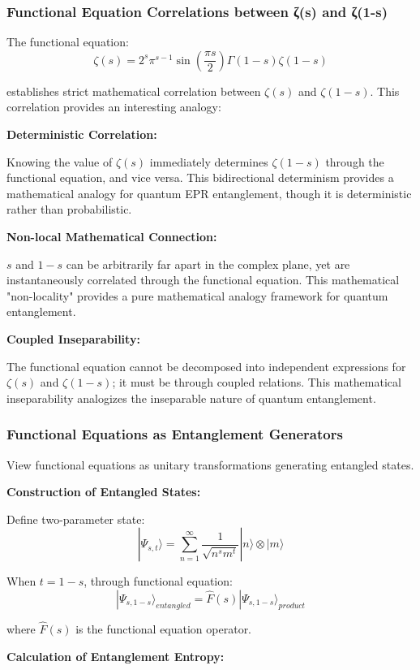 \documentclass[11pt]{article}
\theoremstyle{plain}
\theoremstyle{definition}
\theoremstyle{remark}
\begin{document}
\subsubsection{Functional Equation Correlations between ζ(s) and ζ(1-s)}

The functional equation:
$$\zeta(s) = 2^s \pi^{s-1} \sin(\frac{\pi s}{2}) \Gamma(1-s) \zeta(1-s)$$

establishes strict mathematical correlation between $\zeta(s)$ and $\zeta(1-s)$. This correlation provides an interesting analogy:

\textbf{Deterministic Correlation:}

Knowing the value of $\zeta(s)$ immediately determines $\zeta(1-s)$ through the functional equation, and vice versa. This bidirectional determinism provides a mathematical analogy for quantum EPR entanglement, though it is deterministic rather than probabilistic.

\textbf{Non-local Mathematical Connection:}

$s$ and $1-s$ can be arbitrarily far apart in the complex plane, yet are instantaneously correlated through the functional equation. This mathematical "non-locality" provides a pure mathematical analogy framework for quantum entanglement.

\textbf{Coupled Inseparability:}

The functional equation cannot be decomposed into independent expressions for $\zeta(s)$ and $\zeta(1-s)$; it must be through coupled relations. This mathematical inseparability analogizes the inseparable nature of quantum entanglement.

\subsubsection{Functional Equations as Entanglement Generators}

View functional equations as unitary transformations generating entangled states.

\textbf{Construction of Entangled States:}

Define two-parameter state:
$$|\Psi_{s,t}\rangle = \sum_{n=1}^{\infty} \frac{1}{\sqrt{n^s m^t}} |n\rangle \otimes |m\rangle$$

When $t = 1-s$, through functional equation:
$$|\Psi_{s,1-s}\rangle_{entangled} = \hat{F}(s) |\Psi_{s,1-s}\rangle_{product}$$

where $\hat{F}(s)$ is the functional equation operator.

\textbf{Calculation of Entanglement Entropy:}
\end{document}
